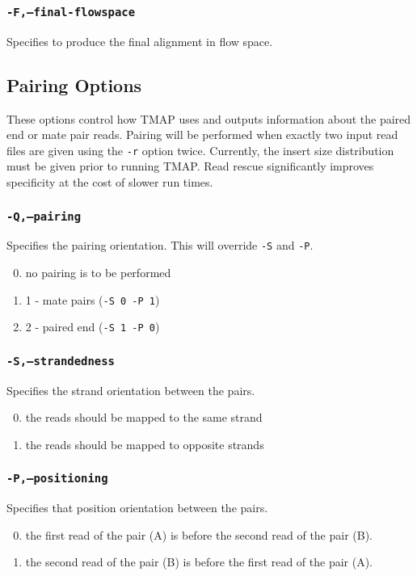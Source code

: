 \documentclass[a4paper,12pt]{book}
\newcommand{\TT}[1]{{\tt #1}} %
\begin{document}
\subsubsection{\TT{-F,--final-flowspace}}
Specifies to produce the final alignment in flow space.

\subsection{Pairing Options}
These options control how TMAP uses and outputs information about the paired end or mate pair reads.
Pairing will be performed when exactly two input read files are given using the \TT{-r} option twice.
Currently, the insert size distribution must be given prior to running TMAP.
Read rescue significantly improves specificity at the cost of slower run times.

\subsubsection{\TT{-Q,--pairing}}
Specifies the pairing orientation.
This will override \TT{-S} and \TT{-P}.
\begin{enumerate}
	\setcounter{enumi}{-1} %
	\item no pairing is to be performed
	\item 1 - mate pairs (\TT{-S 0 -P 1})
	\item 2 - paired end (\TT{-S 1 -P 0})
\end{enumerate}

\subsubsection{\TT{-S,--strandedness}}
Specifies the strand orientation between the pairs.
\begin{enumerate}
	\setcounter{enumi}{-1} %
	\item the reads should be mapped to the same strand
	\item the reads should be mapped to opposite strands
\end{enumerate}

\subsubsection{\TT{-P,--positioning}}
Specifies that position orientation between the pairs.
\begin{enumerate}
	\setcounter{enumi}{-1} %
	\item the first read of the pair (A) is before the second read of the pair (B).
	\item the second read of the pair (B) is before the first read of the pair (A).
\end{enumerate}
\end{document}
